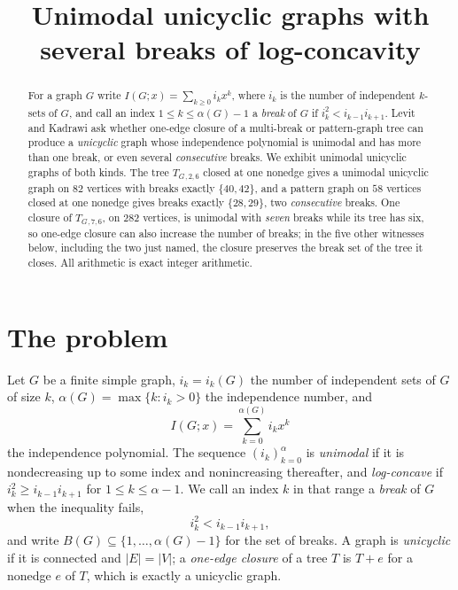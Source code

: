 \documentclass[11pt]{amsart}
\title[Unicyclic graphs with several breaks]
{Unimodal unicyclic graphs with several breaks of log-concavity}
\date{}
\theoremstyle{definition}
\theoremstyle{remark}
\newcommand{\Ip}{I}
\newcommand{\albr}{\alpha}
\newcommand{\TG}{T_{G}}
\begin{document}
\begin{abstract}
For a graph $G$ write $\Ip(G;x)=\sum_{k\ge0}i_kx^k$, where $i_k$ is the number of
independent $k$-sets of $G$, and call an index $1\le k\le\albr(G)-1$ a \emph{break}
of $G$ if $i_k^2<i_{k-1}i_{k+1}$. Levit and Kadrawi
\cite[Problem 6.6]{LevitKadrawi} ask whether one-edge closure of a
multi-break or pattern-graph tree can produce a \emph{unicyclic} graph whose
independence polynomial is unimodal and has more than one break, or even several
\emph{consecutive} breaks. We exhibit unimodal unicyclic graphs of both kinds.
The tree $\TG{}_{,2,6}$ closed at one nonedge gives a unimodal unicyclic graph on
$82$ vertices with breaks exactly $\{40,42\}$, and a pattern graph on $58$ vertices
closed at one nonedge gives breaks exactly $\{28,29\}$, two \emph{consecutive} breaks.
One closure of $\TG{}_{,7,6}$, on $282$ vertices, is unimodal with \emph{seven} breaks
while its tree has six, so one-edge closure can also increase the number of breaks; in
the five other witnesses below, including the two just named, the closure preserves the
break set of the tree it closes. All arithmetic is exact integer arithmetic.
\end{abstract}

\maketitle

\section{The problem}

Let $G$ be a finite simple graph, $i_k=i_k(G)$ the number of independent sets of $G$
of size $k$, $\albr(G)=\max\{k:i_k>0\}$ the independence number, and
\[
  \Ip(G;x)=\sum_{k=0}^{\albr(G)}i_kx^k
\]
the independence polynomial. The sequence $(i_k)_{k=0}^{\albr}$ is \emph{unimodal} if
it is nondecreasing up to some index and nonincreasing thereafter, and
\emph{log-concave} if $i_k^2\ge i_{k-1}i_{k+1}$ for $1\le k\le\albr-1$. We call an
index $k$ in that range a \emph{break} of $G$ when the inequality fails,
\begin{equation}\label{eq:break}
  i_k^2<i_{k-1}i_{k+1},
\end{equation}
and write $B(G)\subseteq\{1,\dots,\albr(G)-1\}$ for the set of breaks. A graph is
\emph{unicyclic} if it is connected and $|E|=|V|$; a \emph{one-edge closure} of a tree
$T$ is $T+e$ for a nonedge $e$ of $T$, which is exactly a unicyclic graph.
\end{document}
